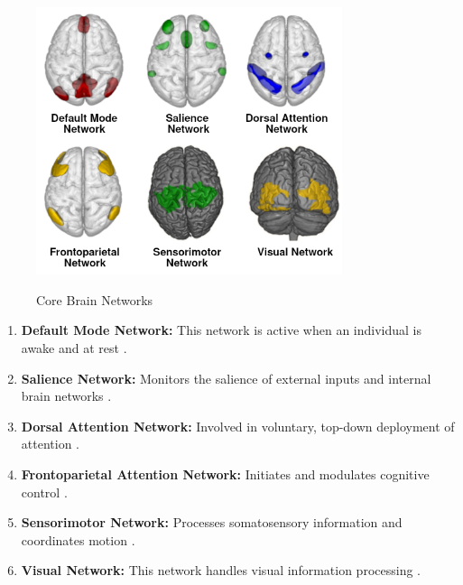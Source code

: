 ﻿\documentclass[12pt]{article}
\begin{document}
\begin{figure}[H]
  \centering
  \includegraphics[width=0.8\textwidth]{brain-networks.png}
  \caption{Core Brain Networks}
  \cite{dorsalattentionfronto}\cite{Majorbrainnetworks}
\end{figure}

\newpage

\begin{enumerate}

  \item \textbf{Default Mode Network:} This network is active when an
    individual is awake and at rest \cite{serendipitousDMN}.

  \item \textbf{Salience Network:} Monitors the salience of external
    inputs and internal brain networks
    \cite{saliencemetabolic}\cite{functionalconnectivity}.

  \item \textbf{Dorsal Attention Network:} Involved in voluntary,
    top-down deployment of attention \cite{thomasorganization}.

  \item \textbf{Frontoparietal Attention Network:} Initiates and
    modulates cognitive control \cite{frontoparietalAttentionFunc}.

  \item \textbf{Sensorimotor Network:} Processes somatosensory
    information and coordinates motion \cite{heine2012resting}.

  \item \textbf{Visual Network:} This network handles visual
    information processing \cite{brainvisual}.

\end{enumerate}
\end{document}
